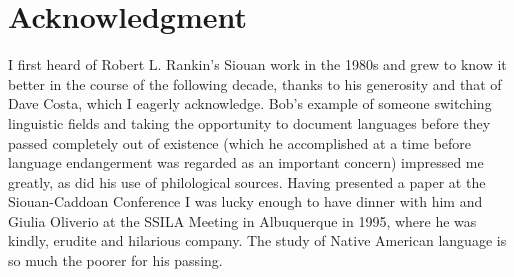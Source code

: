 \documentclass[output=paper]{LSP/langsci}
\begin{document}
\section*{Acknowledgment}
I first heard of 
Robert L. Rankin's
Siouan work in the 1980s and grew to know it better in the course of the following decade, thanks to his generosity and that of Dave Costa, which I eagerly acknowledge. Bob's example of someone switching linguistic fields and taking the opportunity to document languages before they passed completely out of existence (which he accomplished at a time before language endangerment was regarded as an important concern) impressed me greatly, as did his use of philological sources. Having presented a paper at the Siouan-Caddoan Conference I was lucky enough to have dinner with him and Giulia Oliverio at the SSILA Meeting in Albuquerque in 1995, where he was kindly, erudite and hilarious company. The study of Native American language is so much the poorer for his passing.

{\sloppy
\printbibliography[heading=subbibliography,notkeyword=this]
}
\end{document}
